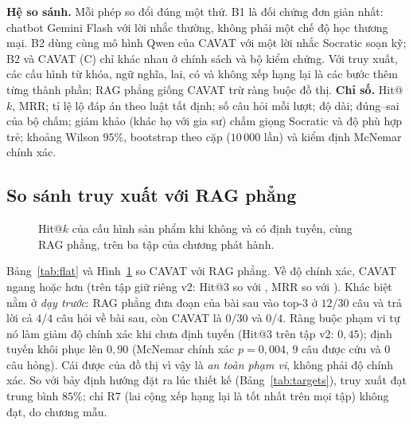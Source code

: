 \documentclass[10pt,a4paper,twocolumn]{article}
\begin{document}
\textbf{Hệ so sánh.} Mỗi phép so đổi đúng một thứ. B1 là đối chứng đơn giản nhất: chatbot Gemini Flash với lời nhắc thường, không phải một chế độ học thương mại. B2 dùng cùng mô hình Qwen của CAVAT với một lời nhắc Socratic soạn kỹ; B2 và CAVAT (C) chỉ khác nhau ở chính sách và bộ kiểm chứng. Với truy xuất, các cấu hình từ khóa, ngữ nghĩa, lai, có và không xếp hạng lại là các bước thêm từng thành phần; RAG phẳng giống CAVAT trừ ràng buộc đồ thị. \textbf{Chỉ số.} Hit@$k$, MRR; tỉ lệ lộ đáp án theo luật tất định; số câu hỏi mỗi lượt; độ dài; đúng--sai của bộ chấm; giám khảo  (khác họ với gia sư) chấm giọng Socratic và độ phù hợp trẻ; khoảng Wilson $95\%$, bootstrap theo cặp ($10\,000$ lần) và kiểm định McNemar chính xác.

\subsection{So sánh truy xuất với RAG phẳng}

\begin{table}[t]
\centering
\caption{Mức đạt so với bảy định hướng thiết kế của truy xuất. Mức đạt $=\min(1,\text{đo được}/\text{mục tiêu})$.}\label{tab:targets}

\end{table}

\begin{table}[t]
\centering
\caption{CAVAT (đồ thị) so với RAG phẳng. ``Đoạn bài sau'': số câu có đoạn của tiết chưa học trong top-3.}\label{tab:flat}

\end{table}

\begin{figure}[t]
\centering

\caption{Hit@$k$ của cấu hình sản phẩm khi không và có định tuyến, cùng RAG phẳng, trên ba tập của chương phát hành.}\label{fig:hitk}
\end{figure}
Bảng~\ref{tab:flat} và Hình~\ref{fig:hitk} so CAVAT với RAG phẳng. Về độ chính xác, CAVAT ngang hoặc hơn (trên tập giữ riêng v2: Hit@3 \CavHitThreeVtwo{} so với \FlatHitThreeVtwo{}, MRR \CavMrrVtwo{} so với \FlatMrrVtwo{}). Khác biệt nằm ở \emph{dạy trước}: RAG phẳng đưa đoạn của bài sau vào top-3 ở $12/30$ câu và trả lời cả $4/4$ câu hỏi về bài sau, còn CAVAT là $0/30$ và $0/4$. Ràng buộc phạm vi tự nó làm giảm độ chính xác khi chưa định tuyến (Hit@3 trên tập v2: $0{,}45$); định tuyến khôi phục lên $0{,}90$ (McNemar chính xác $p=0{,}004$, $9$ câu được cứu và $0$ câu hỏng). Cái được của đồ thị vì vậy là \emph{an toàn phạm vi}, không phải độ chính xác. So với bảy định hướng đặt ra lúc thiết kế (Bảng~\ref{tab:targets}), truy xuất đạt trung bình $85\%$; chỉ R7 (lai cộng xếp hạng lại là tốt nhất trên mọi tập) không đạt, do chương mẫu.
\end{document}
